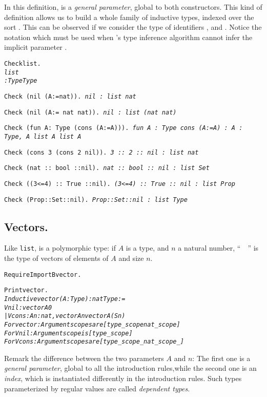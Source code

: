 \documentclass[11pt]{article}
\begin{document}
In this definition,  is a \emph{general parameter}, global
to both constructors.
This kind of definition allows us to build a whole family of
inductive types, indexed over the sort .
This can be observed if we consider the type of identifiers
,  and .
Notice the notation  which must be used 
when {\coq}'s type inference algorithm cannot infer the implicit
parameter .
\begin{alltt}
Check list.
\it list
     : Type {\arrow} Type

\tt Check (nil (A:=nat)).
\it nil
     : list nat

\tt Check (nil (A:= nat {\arrow} nat)).
\it nil
     : list (nat {\arrow} nat)

\tt Check (fun A: Type {\funarrow} (cons (A:=A))).
\it fun A : Type {\funarrow} cons (A:=A)
     : {\prodsym} A : Type, A {\arrow} list A {\arrow} list A

\tt Check (cons 3 (cons 2 nil)).
\it 3 :: 2 :: nil
     : list nat

\tt Check (nat :: bool ::nil).
\it nat :: bool :: nil
     : list Set

\tt Check ((3<=4) :: True ::nil).
\it (3<=4) :: True :: nil
     : list Prop

\tt Check (Prop::Set::nil).
\it Prop::Set::nil
     : list Type
\end{alltt}

\subsection{Vectors.}
\label{vectors}

Like \texttt{list},  is a polymorphic type:
if $A$ is a type, and $n$ a natural number, ``~~''
is the type of vectors of elements of $A$ and size $n$.


\begin{alltt}
Require Import  Bvector.

Print vector.
\it
Inductive vector (A : Type) : nat {\arrow} Type :=
    Vnil : vector A 0
  | Vcons : A {\arrow} {\prodsym} n : nat, vector A n {\arrow} vector A (S n)
For vector: Argument scopes are [type_scope nat_scope]
For Vnil: Argument scope is [type_scope]
For Vcons: Argument scopes are [type_scope _ nat_scope _]
\end{alltt}


Remark the difference between the two parameters $A$ and $n$:
The first one is a \textsl{general parameter}, global to all the
introduction rules,while the second one is an \textsl{index}, which is
instantiated differently in the introduction rules.
Such types parameterized  by regular
values are called \emph{dependent types}.
\end{document}
